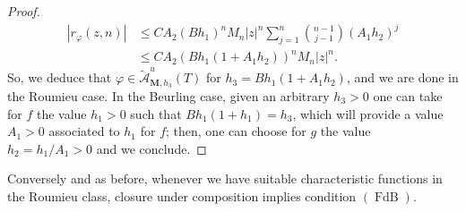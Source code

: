 \documentclass[11pt,a4paper]{article}
\theoremstyle{plain}
\theoremstyle{definition}
\newcommand{\M}{\mathbf{M}}
\let\on=\operatorname
\begin{document}
\begin{proof}
\begin{align*}
|r_{\varphi}(z,n)|
&\le C A_2 (Bh_1)^n M_n |z|^n 
\sum_{j=1}^{n} \binom{n-1}{j-1} (A_1 h_2)^j\\
&\le C A_2 \left( Bh_1(1 + A_1 h_2) \right)^n M_n |z|^n .
\end{align*}
So, we deduce that $\varphi\in\mathcal{\widetilde{A}}^{u}_{\M,h_3}(T)$ for $h_3=Bh_1 (1 + A_1 h_2)$, and we are done in the Roumieu case. In the Beurling case, given an arbitrary $h_3>0$ one can take for $f$ the value $h_1>0$ such that $Bh_1(1+h_1)=h_3$, which will provide a value $A_1>0$ associated to $h_1$ for $f$; then, one can choose for $g$ the value $h_2=h_1/A_1>0$ and we conclude.
\end{proof}

Conversely and as before, whenever we have suitable characteristic functions in the Roumieu class, closure under composition implies condition \hyperlink{s-FdB}{$(\on{FdB})$}. 
\end{document}
